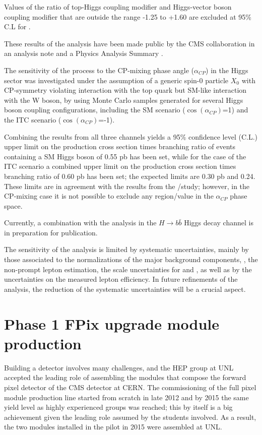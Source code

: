 Values of the ratio of top-Higgs coupling modifier \Ct and Higgs-vector boson coupling modifier \CV that are outside the range -1.25 to +1.60 are excluded at 95\% C.L for .

These results of the analysis have been made public by the CMS collaboration in an analysis note \cite{CMS_AN_2016-378} and a Physics Analysis Summary \cite{CMS_PAS_HIG_17-005}.

The sensitivity of the \tH process to the CP-mixing phase angle ($\alpha_{CP}$) in the Higgs sector was investigated under the assumption of a generic spin-0 particle $X_0$ with CP-symmetry violating interaction with the top quark but SM-like interaction with the W boson, by using Monte Carlo samples generated for several Higgs boson coupling configurations, including the SM scenario ($\cos(\alpha_{CP})$=1) and the ITC scenario ($\cos (\alpha_{CP})$=-1).  

Combining the results from all three channels yields a 95\% confidence level (C.L.) upper limit on the production cross section times branching ratio of events containing a SM Higgs boson of 0.55 pb has been set, while for the case of the ITC scenario a combined upper limit on the production cross section times branching ratio of 0.60 pb has been set; the expected limits are 0.30 pb and 0.24. These limits are in agreement with the results from the \Ct/\CV study; however, in the CP-mixing case it is not possible to exclude any region/value in the $\alpha_{CP}$ phase space.

Currently, a combination with the \tH analysis in the $H \to b\bar{b}$ Higgs decay channel is in preparation for publication.

The sensitivity of the analysis is limited by systematic uncertainties, mainly by those associated to the normalizations of the major background components, \ie, the non-prompt lepton estimation, the scale uncertainties for \ttW and \ttZ, as well as by the uncertainties on the measured lepton efficiency. In future refinements of the analysis, the reduction of the systematic uncertainties will be a crucial aspect.  



\section{Phase 1 FPix upgrade module production}

Building a detector involves many challenges, and the HEP group at UNL accepted the leading role of assembling the modules that compose the forward pixel detector of the CMS detector at CERN. The commissioning of the full pixel module production line started from scratch in late 2012 and by 2015 the same yield level as highly experienced groups was reached; this by itself is a big achievement given the leading role assumed by the students involved. As a result, the two modules installed in the pilot in 2015 were assembled at UNL.  

